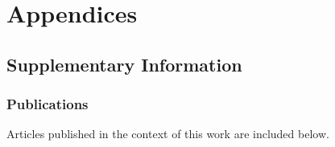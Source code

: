 \ctpartquote{}
\ctparttext{}
\part{Appendices}

\chapter{Supplementary Information}
\label{sec:supdata}

 \section{Publications}
 \label{sec:appendix:publications}

    Articles published in the context of this work are included below.

    
